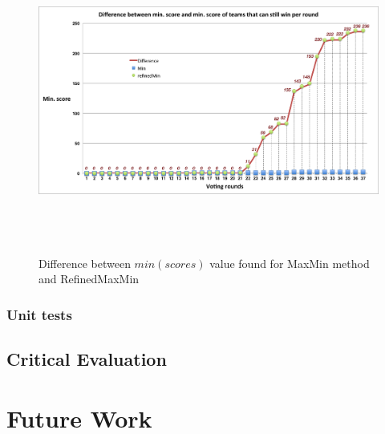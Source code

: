 \documentclass[12pt]{report}
\begin{document}
\begin{figure}[H]
\centering
\includegraphics[width=17cm, height=10cm]{../code/misc/difference_MinvsRefinedMin}
\caption{Difference between $min(scores)$ value found for MaxMin method and RefinedMaxMin}
\label{f_maxminDif}
\end{figure}

\subsubsection{Unit tests}

\subsection{Critical Evaluation}\label{Eval}


\section{Future Work}\label{FutureWork}
\end{document}
